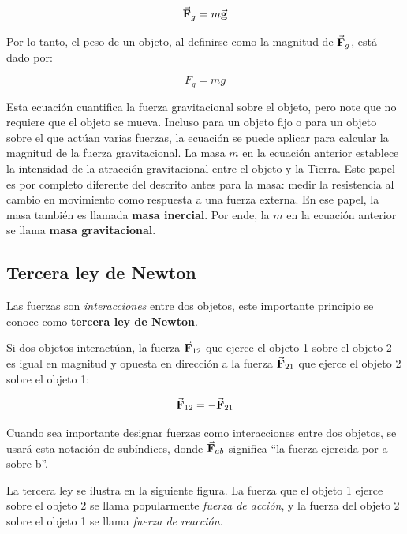     \[
      \vec{\mathbf{F}}_{g} = m \vec{\mathbf{g}}
    \]

    \PN Por lo tanto, el peso de un objeto, al definirse como la magnitud de $\vec{\mathbf{F}}_{g}$, está dado por:

    \[
      F_{g} = m g
    \]

    \PN Esta ecuación cuantifica la fuerza gravitacional sobre el objeto, pero note que no requiere que el objeto se
    mueva. Incluso para un objeto fijo o para un objeto sobre el que actúan varias fuerzas, la ecuación se puede aplicar
    para calcular la magnitud de la fuerza gravitacional. La masa $m$ en la ecuación anterior establece la intensidad de
    la atracción gravitacional entre el objeto y la Tierra. Este papel es por completo diferente del descrito antes para
    la masa: medir la resistencia al cambio en movimiento como respuesta a una fuerza externa. En ese papel, la masa
    también es llamada \textbf{masa inercial}. Por ende, la $m$ en la ecuación anterior se llama
    \textbf{masa gravitacional}.

  \subsection{Tercera ley de Newton}
    \PN Las fuerzas son \textit{interacciones} entre dos objetos, este importante principio se conoce como
    \textbf{tercera ley de Newton}.

    \begin{tcolorbox}
      Si dos objetos interactúan, la fuerza $\vec{\mathbf{F}}_{12}$ que ejerce el objeto 1 sobre el objeto 2 es igual en magnitud
      y opuesta en dirección a la fuerza $\vec{\mathbf{F}}_{21}$ que ejerce el objeto 2 sobre el objeto 1:

      \[
        \vec{\mathbf{F}}_{12} = - \vec{\mathbf{F}}_{21}
      \]
    \end{tcolorbox}

    \PN Cuando sea importante designar fuerzas como interacciones entre dos objetos, se usará esta notación de
    subíndices, donde $\vec{\mathbf{F}}_{ab}$ significa \textquotedblleft la fuerza ejercida por a sobre b\textquotedblright.

    \vspace{3mm}
    \PN La tercera ley se ilustra en la siguiente figura. La fuerza que el objeto 1 ejerce sobre el objeto 2 se llama
    popularmente \textit{fuerza de acción}, y la fuerza del objeto 2 sobre el objeto 1 se llama
    \textit{fuerza de reacción}.

